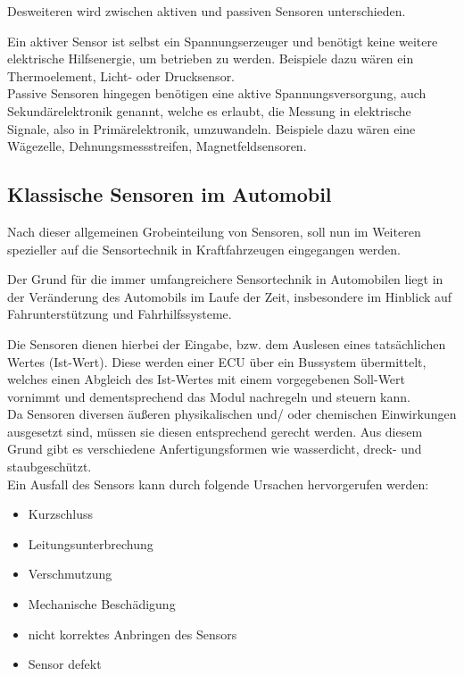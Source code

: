 	                	Desweiteren wird zwischen aktiven und passiven Sensoren unterschieden. 
	                	
	                	Ein aktiver Sensor ist selbst ein Spannungserzeuger und benötigt keine weitere elektrische Hilfsenergie, um betrieben zu werden. Beispiele dazu wären ein Thermoelement, Licht- oder Drucksensor.\\
	                	
	                	Passive Sensoren hingegen benötigen eine aktive Spannungsversorgung, auch Sekundärelektronik genannt, welche es erlaubt, die Messung in elektrische Signale, also in Primärelektronik, umzuwandeln. Beispiele dazu wären eine Wägezelle, Dehnungsmessstreifen, Magnetfeldsensoren.		
	                	
	\newpage                                        
	\subsection{Klassische Sensoren im Automobil} 
	       
	    Nach dieser allgemeinen Grobeinteilung von Sensoren, soll nun im Weiteren spezieller auf die Sensortechnik in Kraftfahrzeugen eingegangen werden.
	
	    Der Grund für die immer umfangreichere Sensortechnik in Automobilen liegt in der Veränderung des Automobils im Laufe der Zeit, insbesondere im Hinblick auf Fahrunterstützung und Fahrhilfssysteme.
	     	
	    Die Sensoren dienen hierbei der Eingabe,  bzw. dem Auslesen eines tatsächlichen Wertes (Ist-Wert). Diese werden einer ECU über ein Bussystem übermittelt, welches einen Abgleich des Ist-Wertes mit einem vorgegebenen Soll-Wert vornimmt und dementsprechend das Modul nachregeln und steuern kann. \\ 
	    
		Da Sensoren diversen äußeren physikalischen und/ oder chemischen 
		Einwirkungen ausgesetzt sind, müssen sie diesen entsprechend 
		gerecht werden. Aus diesem Grund gibt es verschiedene 
		Anfertigungsformen wie wasserdicht, dreck- und staubgeschützt.\\
	            
	    Ein Ausfall des Sensors kann durch folgende Ursachen hervorgerufen werden:
	
	        \begin{itemize}
	            \item Kurzschluss
	            \item Leitungsunterbrechung
	            \item Verschmutzung
	            \item Mechanische Beschädigung
	            \item nicht korrektes Anbringen des Sensors
	            \item Sensor defekt
	        \end{itemize}	
	        

